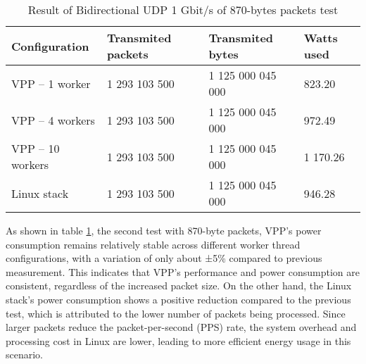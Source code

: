 \begin{table}[h!]
\centering
\begin{tabular}{|l|l|l|l|}
\hline
\textbf{Configuration} & \textbf{Transmited packets} & \textbf{Transmited bytes} & \textbf{Watts used} \\
\hline
VPP -- 1 worker & 1 293 103 500 & 1 125 000 045 000 & 823.20\\
VPP -- 4 workers & 1 293 103 500 & 1 125 000 045 000 & 972.49\\
VPP -- 10 workers & 1 293 103 500 & 1 125 000 045 000 & 1 170.26\\
Linux stack & 1 293 103 500 & 1 125 000 045 000 & 946.28\\
\hline
\end{tabular}
\caption{Result of Bidirectional UDP 1 Gbit/s of 870-bytes packets test}
\label{tab:udp:two}
\end{table}

As shown in table \ref{tab:udp:two}, the second test with 870-byte packets, 
VPP's power consumption remains relatively stable across different worker thread configurations, with a variation of only about ±5\% compared to previous measurement. 
This indicates that VPP's performance and power consumption are consistent, regardless of the increased packet size. 
On the other hand, the Linux stack's power consumption shows a positive reduction compared to the previous test, which is attributed to the lower number of packets being processed. 
Since larger packets reduce the packet-per-second (PPS) rate, the system overhead and processing cost in Linux are lower, leading to more efficient energy usage in this scenario.











